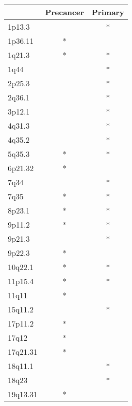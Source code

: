 \begin{tabular}{lcc}
\toprule
{} & Precancer & Primary \\
\midrule
1p13.3   &           &       * \\
1p36.11  &         * &         \\
1q21.3   &         * &       * \\
1q44     &           &       * \\
2p25.3   &           &       * \\
2q36.1   &           &       * \\
3p12.1   &           &       * \\
4q31.3   &           &       * \\
4q35.2   &           &       * \\
5q35.3   &         * &       * \\
6p21.32  &         * &         \\
7q34     &           &       * \\
7q35     &         * &       * \\
8p23.1   &         * &       * \\
9p11.2   &         * &       * \\
9p21.3   &           &       * \\
9p22.3   &         * &         \\
10q22.1  &         * &       * \\
11p15.4  &         * &       * \\
11q11    &         * &         \\
15q11.2  &           &       * \\
17p11.2  &         * &         \\
17q12    &         * &         \\
17q21.31 &         * &         \\
18q11.1  &           &       * \\
18q23    &           &       * \\
19q13.31 &         * &         \\
\bottomrule
\end{tabular}
